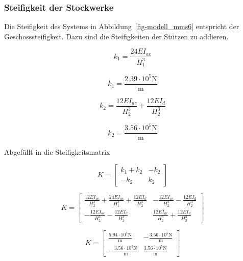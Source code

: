 \documentclass[
  letterpaper,
  DIV=11]{scrreprt}
\begin{document}
\hypertarget{steifigkeit-der-stockwerke-1}{%
\subsubsection{Steifigkeit der
Stockwerke}\label{steifigkeit-der-stockwerke-1}}

Die Steifigkeit des Systems in Abbildung~\ref{fig-modell_mms6}
entspricht der Geschosssteifigkeit. Dazu sind die Steifigkeiten der
Stützen zu addieren.

\begin{equation}k_{1} = \frac{24 EI_{ac}}{H_{1}^{3}}\end{equation}

\begin{equation}k_{1} = \frac{2.39 \cdot 10^{5} \text{N}}{\text{m}}\end{equation}

\begin{equation}k_{2} = \frac{12 EI_{ac}}{H_{2}^{3}} + \frac{12 EI_{d}}{H_{2}^{3}}\end{equation}

\begin{equation}k_{2} = \frac{3.56 \cdot 10^{5} \text{N}}{\text{m}}\end{equation}

Abgefüllt in die Steifigkeitsmatrix

\begin{equation}K = \left[\begin{matrix}k_{1} + k_{2} & - k_{2}\\- k_{2} & k_{2}\end{matrix}\right]\end{equation}

\begin{equation}K = \left[\begin{matrix}\frac{12 EI_{ac}}{H_{2}^{3}} + \frac{24 EI_{ac}}{H_{1}^{3}} + \frac{12 EI_{d}}{H_{2}^{3}} & - \frac{12 EI_{ac}}{H_{2}^{3}} - \frac{12 EI_{d}}{H_{2}^{3}}\\- \frac{12 EI_{ac}}{H_{2}^{3}} - \frac{12 EI_{d}}{H_{2}^{3}} & \frac{12 EI_{ac}}{H_{2}^{3}} + \frac{12 EI_{d}}{H_{2}^{3}}\end{matrix}\right]\end{equation}

\begin{equation}K = \left[\begin{matrix}\frac{5.94 \cdot 10^{5} \text{N}}{\text{m}} & - \frac{3.56 \cdot 10^{5} \text{N}}{\text{m}}\\- \frac{3.56 \cdot 10^{5} \text{N}}{\text{m}} & \frac{3.56 \cdot 10^{5} \text{N}}{\text{m}}\end{matrix}\right]\end{equation}
\end{document}
